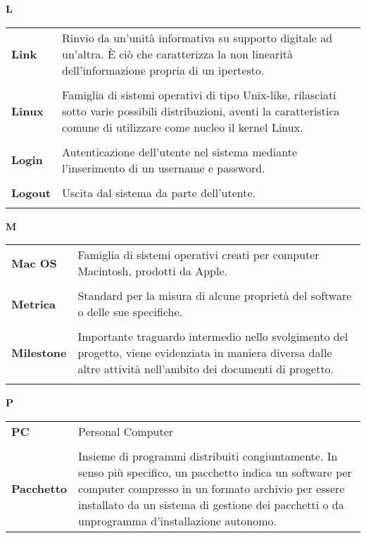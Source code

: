 {\begin{longtable}{L{4cm} p{10cm}}
 \\ 
\end{longtable} 
\newpage 
{} 
{} 
\hfill\Huge{\textbf{L}} \\ 
\normalsize 
\begin{longtable}{L{4cm} p{10cm}}
\textbf{Link} & Rinvio da un'unità informativa su supporto digitale ad un'altra. È ciò che caratterizza la non linearità dell'informazione propria di un ipertesto. \\ 
 \\ 
\textbf{Linux} & Famiglia di sistemi operativi di tipo Unix-like, rilasciati sotto varie possibili distribuzioni, aventi la caratteristica comune di utilizzare come nucleo il kernel Linux. \\ 
 \\ 
\textbf{Login} & Autenticazione dell’utente nel sistema mediante l’inserimento di un username e password. \\ 
 \\ 
\textbf{Logout} & Uscita dal sistema da parte dell’utente. \\ 
 \\ 
\end{longtable} 
\newpage 
{} 
{} 
\hfill\Huge{\textbf{M}} \\ 
\normalsize 
\begin{longtable}{L{4cm} p{10cm}}
\textbf{Mac OS} & Famiglia di sistemi operativi creati per computer Macintosh, prodotti da Apple. \\ 
 \\ 
\textbf{Metrica} & Standard per la misura di alcune proprietà del software o delle sue specifiche. \\ 
 \\ 
\textbf{Milestone} & Importante traguardo intermedio nello svolgimento del progetto, viene evidenziata in maniera diversa dalle altre attività nell'ambito dei documenti di progetto. \\ 
 \\ 
\end{longtable} 
\newpage 
{} 
{} 
\hfill\Huge{\textbf{P}} \\ 
\normalsize 
\begin{longtable}{L{4cm} p{10cm}}
\textbf{PC} & Personal Computer \\ 
 \\ 
\textbf{Pacchetto} & Insieme di programmi distribuiti congiuntamente. In senso più specifico, un pacchetto indica un software per computer compresso in un formato archivio per essere installato da un sistema di gestione dei pacchetti o da unprogramma d'installazione autonomo. \\ 

\end{longtable}}
